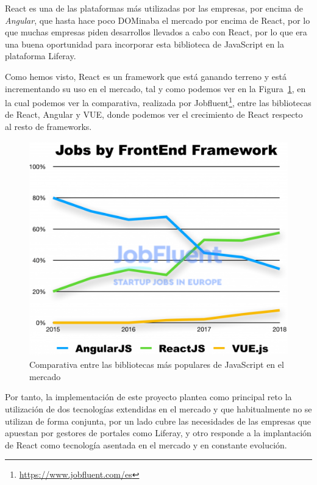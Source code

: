 \documentclass[a4paper, 12pt]{book}
\begin{document}
\vspace{5mm} %
React es una de las plataformas más utilizadas por las empresas, por encima de \textit{Angular}, que hasta hace poco DOMinaba el mercado por encima de React, por lo que muchas empresas piden desarrollos llevados a cabo con React, por lo que era una buena oportunidad para incorporar esta biblioteca de JavaScript en la plataforma Liferay.

\vspace{5mm} %
Como hemos visto, React es un framework que está ganando terreno y está incrementando su uso en el mercado, tal y como podemos ver en la Figura~\ref{fig:react_mercado}, en la cual podemos ver la comparativa, realizada por Jobfluent\footnote{\url{https://www.jobfluent.com/es}}, entre las bibliotecas de React, Angular y VUE, donde podemos ver el crecimiento de React respecto al resto de frameworks.
\begin{figure}[h]
  \centering
  \includegraphics{img_usadas/react_mercado.png}
  \caption{Comparativa entre las bibliotecas más populares de JavaScript en el mercado}
  \label{fig:react_mercado}
\end{figure}

\vspace{5mm}
Por tanto, la implementación de este proyecto plantea como principal reto la utilización de dos tecnologías extendidas en el mercado y que habitualmente no se utilizan de forma conjunta, por un lado cubre las necesidades de las empresas que apuestan por gestores de portales como Liferay, y otro responde a la implantación de React como tecnología asentada en el mercado y en constante evolución.
\end{document}

